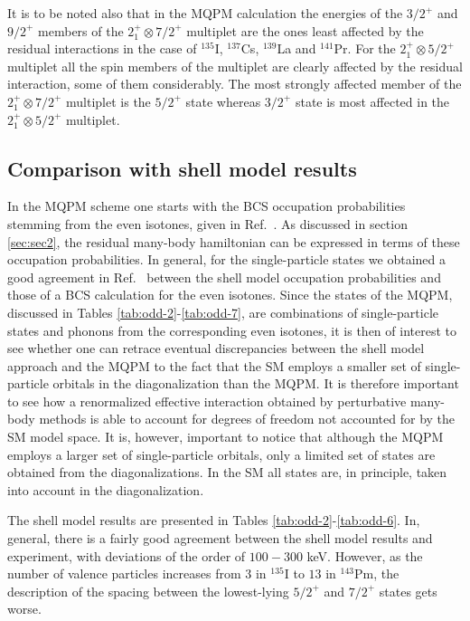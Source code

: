 It is to be noted also that in the MQPM calculation the energies of 
the $3/2^+$ and $9/2^+$ members of the $2^+_1\otimes 7/2^+$ multiplet
are the ones least affected by the residual interactions in the case of
$^{135}$I, $^{137}$Cs, $^{139}$La and $^{141}$Pr.
For the $2^+_1\otimes 5/2^+$ multiplet
all the spin members  of the multiplet are clearly affected by the residual
interaction, some of them considerably. The most strongly 
affected member of the
$2^+_1\otimes 7/2^+$ multiplet is the $5/2^+$ state whereas $3/2^+$ state
is most affected in the $2^+_1\otimes 5/2^+$ multiplet.


\subsection{Comparison with shell model results}

In the MQPM scheme one starts with the BCS occupation 
probabilities stemming from the even isotones, given
in Ref.\ \cite{HOL97}. As discussed in section \ref{sec:sec2}, the
residual many-body hamiltonian can be expressed in terms of these
occupation probabilities. In general, for the single-particle states
we obtained a good agreement in Ref.\ \cite{HOL97} 
between the shell model occupation
probabilities and those of a BCS calculation 
for the even isotones. Since the states of the MQPM, discussed
in Tables \ref{tab:odd-2}-\ref{tab:odd-7}, are combinations
of single-particle states and phonons from the 
corresponding even isotones, it is then of interest
to see whether one can retrace eventual discrepancies 
between the shell model approach and the MQPM to the fact
that the SM employs a smaller set of single-particle
orbitals in the diagonalization than the MQPM.
It is therefore important to see how a renormalized
effective interaction obtained by perturbative many-body
methods is able to account for degrees of freedom 
not accounted for by the SM model space.  
It is, however, important to notice that although the
MQPM employs a larger set of single-particle orbitals, only 
a limited set of states are obtained from the 
diagonalizations. In the SM all states are, in principle,
taken into account in the diagonalization.
  
The shell model results are presented in Tables 
\ref{tab:odd-2}-\ref{tab:odd-6}.
In, general, there is a fairly good agreement 
between the shell model results and experiment, with
deviations of the order of $100-300$ keV. However, as the
number of valence particles increases from $3$ in 
$^{135}$I to $13$ in $^{143}$Pm, the description of the 
spacing between the lowest-lying $5/2^+$ and $7/2^+$ states gets worse. 

